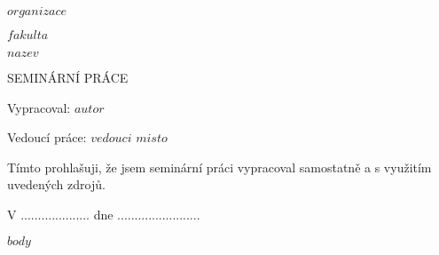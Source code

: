 \documentclass[12pt,a4paper,oneside]{article}
\begin{document}
\pagestyle{empty} %

\begin{center}
\Large
$organizace$

$fakulta$

\vspace*{\fill}

\Huge
$nazev$

\Large
SEMINÁRNÍ PRÁCE

\vspace{4em}
\vspace*{\fill}

\end{center}

{\setlength\parindent{0pt} %
Vypracoval: $autor$

Vedoucí práce: $vedouci$
\hfill $misto$ \the\year}

\clearpage

\vspace*{\fill}

Tímto prohlašuji, že jsem seminární práci vypracoval samostatně
a s využitím uvedených zdrojů.

V .................... dne ........................
   
\hspace{8.5cm} \makebox[2in]{\hrulefill}
  				 
\hspace{8.5cm} 	

\clearpage

\tableofcontents
\clearpage

\pagestyle{plain}

$body$

\printendnotes[custom]
\end{document}
